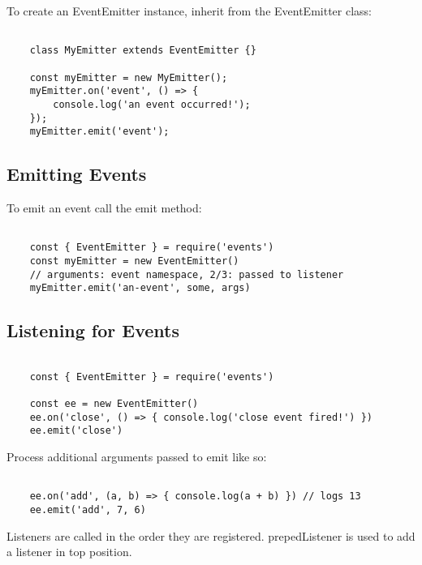 \documentclass{scrartcl}
\begin{document}
To create an EventEmitter instance, inherit from the EventEmitter class:

\begin{lstlisting}[style=ES6]

    class MyEmitter extends EventEmitter {}

    const myEmitter = new MyEmitter();
    myEmitter.on('event', () => {
        console.log('an event occurred!');
    });
    myEmitter.emit('event');

\end{lstlisting}

\subsection{Emitting Events}

To emit an event call the emit method:

\begin{lstlisting}[style=ES6]

    const { EventEmitter } = require('events')
    const myEmitter = new EventEmitter()
    // arguments: event namespace, 2/3: passed to listener
    myEmitter.emit('an-event', some, args)

\end{lstlisting}

\subsection{Listening for Events}

\begin{lstlisting}[style=ES6]

    const { EventEmitter } = require('events')

    const ee = new EventEmitter()
    ee.on('close', () => { console.log('close event fired!') })
    ee.emit('close')

\end{lstlisting}

Process additional arguments passed to emit like so:

\begin{lstlisting}[style=ES6]

    ee.on('add', (a, b) => { console.log(a + b) }) // logs 13
    ee.emit('add', 7, 6)

\end{lstlisting}

Listeners are called in the order they are registered. prepedListener is used to add a listener in top position.
\end{document}
